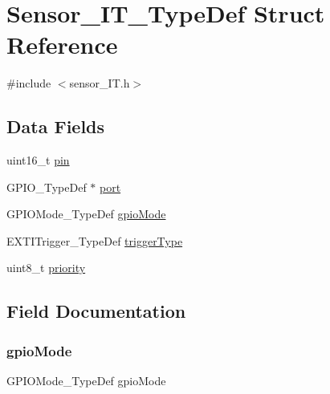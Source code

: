 \hypertarget{struct_sensor___i_t___type_def}{}\section{Sensor\+\_\+\+I\+T\+\_\+\+Type\+Def Struct Reference}
\label{struct_sensor___i_t___type_def}


{\ttfamily \#include $<$sensor\+\_\+\+I\+T.\+h$>$}

\subsection*{Data Fields}
\begin{DoxyCompactItemize}
\item 
uint16\+\_\+t \hyperlink{struct_sensor___i_t___type_def_a4144813adfa4dfe7e7cbeea17d1b06eb}{pin}
\item 
G\+P\+I\+O\+\_\+\+Type\+Def $\ast$ \hyperlink{struct_sensor___i_t___type_def_a82241972e0292c7de95ea1e293e11be3}{port}
\item 
G\+P\+I\+O\+Mode\+\_\+\+Type\+Def \hyperlink{struct_sensor___i_t___type_def_afa8578d9bd7179c1b9c23da9f99734d3}{gpio\+Mode}
\item 
E\+X\+T\+I\+Trigger\+\_\+\+Type\+Def \hyperlink{struct_sensor___i_t___type_def_a6625b6963fd4f630224d40f04877bd21}{trigger\+Type}
\item 
uint8\+\_\+t \hyperlink{struct_sensor___i_t___type_def_a0ad043071ccc7a261d79a759dc9c6f0c}{priority}
\end{DoxyCompactItemize}


\subsection{Field Documentation}
\mbox{\label{struct_sensor___i_t___type_def_afa8578d9bd7179c1b9c23da9f99734d3}} 
\subsubsection{\texorpdfstring{gpio\+Mode}{gpioMode}}
{\footnotesize\ttfamily G\+P\+I\+O\+Mode\+\_\+\+Type\+Def gpio\+Mode}

\mbox{\label{struct_sensor___i_t___type_def_a4144813adfa4dfe7e7cbeea17d1b06eb}} 
